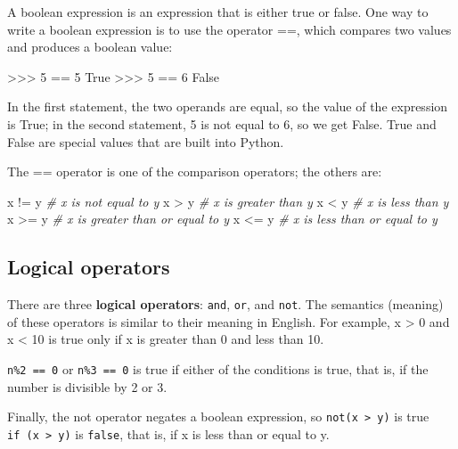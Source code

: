 \documentclass[11pt]{article}
\newenvironment{Shaded}{}{}
\newcommand{\DecValTok}[1]{\textcolor[rgb]{0.25,0.63,0.44}{{#1}}}
\newcommand{\CommentTok}[1]{\textcolor[rgb]{0.38,0.63,0.69}{\textit{{#1}}}}
\newcommand{\NormalTok}[1]{{#1}}
\newcommand{\VariableTok}[1]{\textcolor[rgb]{0.10,0.09,0.49}{{#1}}}
\newcommand{\OperatorTok}[1]{\textcolor[rgb]{0.40,0.40,0.40}{{#1}}}
\begin{document}
A boolean expression is an expression that is either true or false. One
way to write a boolean expression is to use the operator ==, which
compares two values and produces a boolean value:

\begin{Shaded}
\begin{Highlighting}[]
\OperatorTok{>>>} \DecValTok{5} \OperatorTok{==} \DecValTok{5} 
\VariableTok{True} 
\OperatorTok{>>>} \DecValTok{5} \OperatorTok{==} \DecValTok{6} 
\VariableTok{False} 
\end{Highlighting}
\end{Shaded}

In the first statement, the two operands are equal, so the value of the
expression is True; in the second statement, 5 is not equal to 6, so we
get False. True and False are special values that are built into Python.

The == operator is one of the comparison operators; the others are:

\begin{Shaded}
\begin{Highlighting}[]
\NormalTok{x }\OperatorTok{!=}\NormalTok{ y               }\CommentTok{# x is not equal to y }
\NormalTok{x }\OperatorTok{>}\NormalTok{ y                }\CommentTok{# x is greater than y }
\NormalTok{x }\OperatorTok{<}\NormalTok{ y                }\CommentTok{# x is less than y }
\NormalTok{x }\OperatorTok{>=}\NormalTok{ y               }\CommentTok{# x is greater than or equal to y }
\NormalTok{x }\OperatorTok{<=}\NormalTok{ y               }\CommentTok{# x is less than or equal to y }
\end{Highlighting}
\end{Shaded}

    \subsection{Logical operators}\label{logical-operators}

There are three \textbf{logical operators}: \texttt{and}, \texttt{or},
and \texttt{not}. The semantics (meaning) of these operators is similar
to their meaning in English. For example, x \textgreater{} 0 and x
\textless{} 10 is true only if x is greater than 0 and less than 10.

\texttt{n\%2\ ==\ 0} or \texttt{n\%3\ ==\ 0} is true if either of the
conditions is true, that is, if the number is divisible by 2 or 3.

Finally, the not operator negates a boolean expression, so
\texttt{not(x\ \textgreater{}\ y)} is true
\texttt{if\ (x\ \textgreater{}\ y)} is \texttt{false}, that is, if x is
less than or equal to y.
\end{document}
